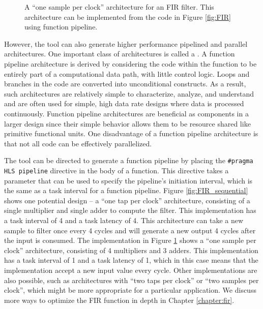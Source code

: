 \begin{figure}
\centering
\mbox{}\mbox{}
\caption{A ``one sample per clock'' architecture for an FIR filter.  This architecture can be implemented from the code in Figure \ref{fig:FIR} using function pipeline.}\label{fig:FIR_function_pipeline}
\end{figure}

However, the \VHLS tool can also generate higher performance pipelined and parallel architectures.  One important class of architectures is called a .  A function pipeline architecture is derived by considering the code within the function to be entirely part of a computational data path, with little control logic.  Loops and branches in the code are converted into unconditional constructs.  As a result, such architectures are relatively simple to characterize, analyze, and understand and are often used for simple, high data rate designs where data is processed continuously.  Function pipeline architectures are beneficial as components in a larger design since their simple behavior allows them to be resource shared like primitive functional units.  One disadvantage of a function pipeline architecture is that not all code can be effectively parallelized.

The \VHLS tool can be directed to generate a function pipeline by placing the \lstinline|#pragma HLS pipeline| directive in the body of a function.  This directive takes a parameter that can be used to specify the pipeline's initiation interval, which is the same as a task interval for a function pipeline.  Figure \ref{fig:FIR_sequential} shows one potential design -- a ``one tap per clock'' architecture, consisting of a single multiplier and single adder to compute the filter.  This implementation has a task interval of 4 and a task latency of 4.  This architecture can take a new sample to filter once every 4 cycles and will generate a new output 4 cycles after the input is consumed. The implementation in Figure \ref{fig:FIR_function_pipeline} shows a ``one sample per clock'' architecture, consisting of 4 multipliers and 3 adders.  This implementation has a task interval of 1 and a task latency of 1, which in this case means that the implementation accept a new input value every cycle. Other implementations are also possible, such as architectures with ``two taps per clock'' or ``two samples per clock'', which might be more appropriate for a particular application.   We discuss more ways to optimize the FIR function in depth in Chapter \ref{chapter:fir}. 

